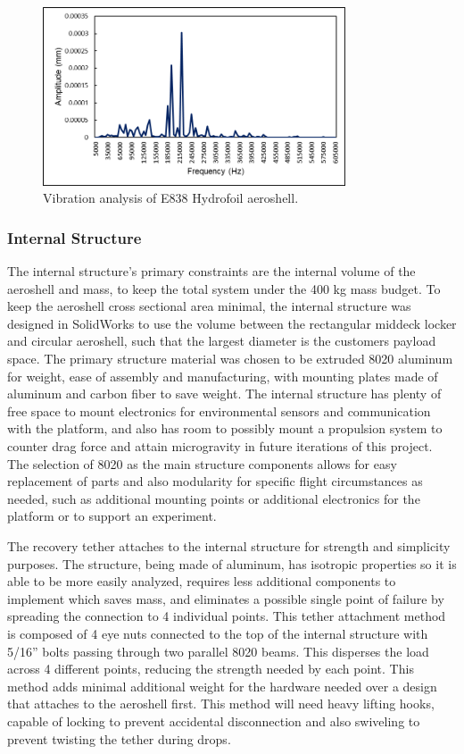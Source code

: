 \begin{figure}[H]
  \centering
  \includegraphics[width=0.8\textwidth]{Aeroshell/vibration.png}
  \caption{\label{fig:vibration}Vibration analysis of E838 Hydrofoil aeroshell.}
\end{figure}

\subsubsection{Internal Structure}

\indent\indent The internal structure's primary constraints are the internal volume of the aeroshell and mass, to keep the total system under the 400 kg mass budget. To keep the aeroshell cross sectional area minimal, the internal structure was designed in SolidWorks to use the volume between the rectangular middeck locker and circular aeroshell, such that the largest diameter is the customers payload space. The primary structure material was chosen to be extruded 8020 aluminum for weight, ease of assembly and manufacturing, with mounting plates made of aluminum and carbon fiber to save weight. The internal structure has plenty of free space to mount electronics for environmental sensors and communication with the platform, and also has room to possibly mount a propulsion system to counter drag force and attain microgravity in future iterations of this project. The selection of 8020 as the main structure components allows for easy replacement of parts and also modularity for specific flight circumstances as needed, such as additional mounting points or additional electronics for the platform or to support an experiment.

\indent\indent The recovery tether attaches to the internal structure for strength and simplicity purposes. The structure, being made of aluminum, has isotropic properties so it is able to be more easily analyzed, requires less additional components to implement which saves mass, and eliminates a possible single point of failure by spreading the connection to 4 individual points. This tether attachment method is composed of 4 eye nuts connected to the top of the internal structure with 5/16” bolts passing through two parallel 8020 beams. This disperses the load across 4 different points, reducing the strength needed by each point. This method adds minimal additional weight for the hardware needed over a design that attaches to the aeroshell first. This method will need heavy lifting hooks, capable of locking to prevent accidental disconnection and also swiveling to prevent twisting the tether during drops.

